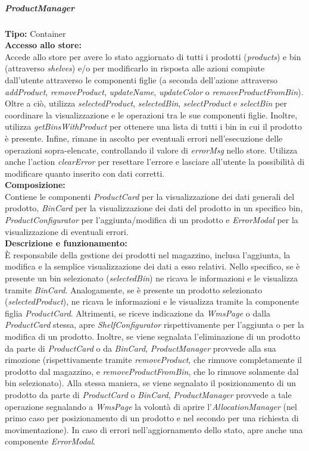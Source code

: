 \subparagraph{\colorbox{verde_uml}{ProductManager}}
\textbf{Tipo:} Container \\
\textbf{Accesso allo store:} \\
Accede allo store per avere lo stato aggiornato di tutti i prodotti (\textit{products}) e bin (attraverso \textit{shelves}) e/o per modificarlo in risposta alle azioni compiute dall'utente attraverso le componenti figlie (a seconda dell'azione attraverso \textit{addProduct}, \textit{removeProduct}, \textit{updateName}, \textit{updateColor} o \textit{removeProductFromBin}). Oltre a ciò, utilizza \textit{selectedProduct}, \textit{selectedBin}, \textit{selectProduct} e \textit{selectBin} per coordinare la visualizzazione e le operazioni tra le sue componenti figlie. Inoltre, utilizza \textit{getBinsWithProduct} per ottenere una lista di tutti i bin in cui il prodotto è presente. Infine, rimane in ascolto per eventuali errori nell'esecuzione delle operazioni sopra-elencate, controllando il valore di \textit{errorMsg} nello store. Utilizza anche l'action \textit{clearError} per resettare l'errore e lasciare all'utente la possibilità di modificare quanto inserito con dati corretti.
\\
\textbf{Composizione:} \\
Contiene le componenti \textit{ProductCard} per la visualizzazione dei dati generali del prodotto, \textit{BinCard} per la visualizzazione dei dati del prodotto in un specifico bin, \textit{ProductConfigurator} per l'aggiunta/modifica di un prodotto e \textit{ErrorModal} per la visualizzazione di eventuali errori.
\\
\textbf{Descrizione e funzionamento:} \\
È responsabile della gestione dei prodotti nel magazzino, inclusa l'aggiunta, la modifica e la semplice visualizzazione dei dati a esso relativi. 
Nello specifico, se è presente un bin selezionato (\textit{selectedBin}) ne ricava le informazioni e le visualizza tramite \textit{BinCard}. Analogamente, se è presente un prodotto selezionato (\textit{selectedProduct}), ne ricava le informazioni e le visualizza tramite la componente figlia \textit{ProductCard}. Altrimenti, se riceve indicazione da \textit{WmsPage} o dalla \textit{ProductCard} stessa, apre \textit{ShelfConfigurator} rispettivamente per l'aggiunta o per la modifica di un prodotto.  Inoltre, se viene segnalata l'eliminazione di un prodotto da parte di \textit{ProductCard} o da \textit{BinCard}, \textit{ProductManager} provvede alla sua rimozione (rispettivamente tramite \textit{removeProduct}, che rimuove completamente il prodotto dal magazzino, e \textit{removeProductFromBin}, che lo rimuove solamente dal bin selezionato). Alla stessa maniera, se viene segnalato il posizionamento di un prodotto da parte di \textit{ProductCard} o \textit{BinCard}, \textit{ProductManager} provvede a tale operazione segnalando a \textit{WmsPage} la volontà di aprire l'\textit{AllocationManager} (nel primo caso per posizionamento di un prodotto e nel secondo per una richiesta di movimentazione).
In caso di errori nell'aggiornamento dello stato, apre anche una componente \textit{ErrorModal}.

